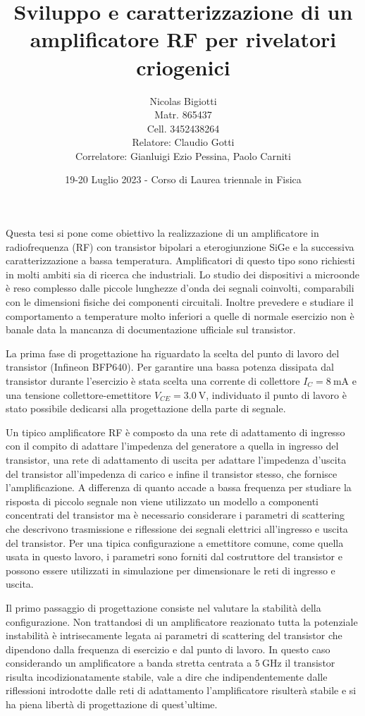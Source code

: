 \documentclass[12pt]{article}
\title{Sviluppo e caratterizzazione di un amplificatore RF per rivelatori criogenici}
\author{Nicolas Bigiotti\\{\small Matr. 865437}\\{\small Cell. 3452438264 }\\[0.5cm]{\small Relatore: Claudio Gotti}\\{\small Correlatore: Gianluigi Ezio Pessina, Paolo Carniti}}
\date{19-20 Luglio 2023 - Corso di Laurea triennale in Fisica}
\begin{document}
\maketitle

Questa tesi si pone come obiettivo la realizzazione di un amplificatore in radiofrequenza (RF) con transistor bipolari a eterogiunzione SiGe e la successiva caratterizzazione a bassa temperatura. Amplificatori di questo tipo sono richiesti in molti ambiti sia di ricerca che industriali. Lo studio dei dispositivi a microonde è reso complesso dalle piccole lunghezze d'onda dei segnali coinvolti, comparabili con le dimensioni fisiche dei componenti circuitali. Inoltre prevedere e studiare il comportamento a temperature molto inferiori a quelle di normale esercizio non è banale data la mancanza di documentazione ufficiale sul transistor.

La prima fase di progettazione ha riguardato la scelta del punto di lavoro del transistor (Infineon BFP640). Per garantire una bassa potenza dissipata dal transistor durante l'esercizio è stata scelta una corrente di collettore $I_{C}=\SI{8}{\milli\ampere}$ e una tensione collettore-emettitore $V_{CE}=\SI{3.0}{\volt}$, individuato il punto di lavoro è stato possibile dedicarsi alla progettazione della parte di segnale.

Un tipico amplificatore RF è composto da una rete di adattamento di ingresso con il compito di adattare l'impedenza del generatore a quella in ingresso del transistor, una rete di adattamento di uscita per adattare l'impedenza d'uscita del transistor all'impedenza di carico e infine il transistor stesso, che fornisce l'amplificazione. A differenza di quanto accade a bassa frequenza per studiare la risposta di piccolo segnale non viene utilizzato un modello a componenti concentrati del transistor ma è necessario considerare i parametri di scattering che descrivono trasmissione e riflessione dei segnali elettrici all'ingresso e uscita del transistor. Per una tipica configurazione a emettitore comune, come quella usata in questo lavoro, i parametri sono forniti dal costruttore del transistor e possono essere utilizzati in simulazione per dimensionare le reti di ingresso e uscita.

Il primo passaggio di progettazione consiste nel valutare la stabilità della configurazione. Non trattandosi di un amplificatore reazionato tutta la potenziale instabilità è intrisecamente legata ai parametri di scattering del transistor che dipendono dalla frequenza di esercizio e dal punto di lavoro. In questo caso considerando un amplificatore a banda stretta centrata a $\SI{5}{\giga\hertz}$ il transistor risulta incodizionatamente stabile, vale a dire che indipendentemente dalle riflessioni introdotte dalle reti di adattamento l'amplificatore risulterà stabile e si ha piena libertà di progettazione di quest'ultime.
\end{document}
